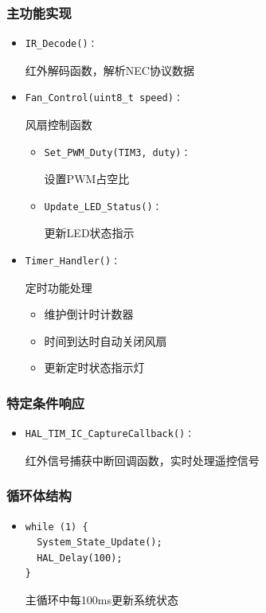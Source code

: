 \subsubsection{主功能实现}
\begin{itemize}
    \item \begin{verbatim}IR_Decode()：\end{verbatim}红外解码函数，解析NEC协议数据
    \item \begin{verbatim}Fan_Control(uint8_t speed)：\end{verbatim}风扇控制函数
          \begin{itemize}
              \item \begin{verbatim}Set_PWM_Duty(TIM3, duty)：\end{verbatim}设置PWM占空比
              \item \begin{verbatim}Update_LED_Status()：\end{verbatim}更新LED状态指示
          \end{itemize}
    \item \begin{verbatim}Timer_Handler()：\end{verbatim}
          定时功能处理
          \begin{itemize}
              \item 维护倒计时计数器
              \item 时间到达时自动关闭风扇
              \item 更新定时状态指示灯
          \end{itemize}
\end{itemize}

\subsubsection{特定条件响应}
\begin{itemize}
    \item \begin{verbatim}HAL_TIM_IC_CaptureCallback()：\end{verbatim}红外信号捕获中断回调函数，实时处理遥控信号
\end{itemize}

\subsubsection{循环体结构}
\begin{itemize}
    \item \begin{verbatim}while (1) {
  System_State_Update();
  HAL_Delay(100);
}\end{verbatim}主循环中每100ms更新系统状态
\end{itemize}

